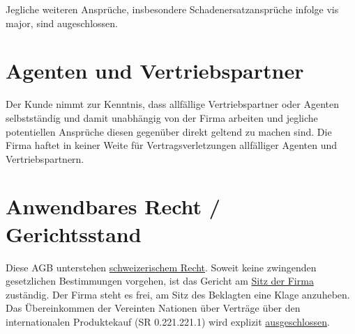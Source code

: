 \documentclass[twocolumn, 10pt]{article}
\begin{document}
Jegliche weiteren Ansprüche, insbesondere Schadenersatzansprüche infolge vis major, sind augeschlossen.

\section{Agenten und Vertriebspartner}
Der Kunde nimmt zur Kenntnis, dass allfällige Vertriebspartner oder Agenten selbstständig und damit unabhängig von der Firma arbeiten und jegliche potentiellen Ansprüche diesen gegenüber direkt geltend zu machen sind. Die Firma haftet in keiner Weite für Vertragsverletzungen allfälliger Agenten und Vertriebspartnern.

\section{Anwendbares Recht / Gerichtsstand}
Diese AGB unterstehen \underline{schweizerischem Recht}. Soweit keine zwingenden gesetzlichen Bestimmungen vorgehen, ist das Gericht am \underline{Sitz der Firma} zuständig. Der Firma steht es frei, am Sitz des Beklagten eine Klage anzuheben. Das Übereinkommen der Vereinten Nationen über Verträge über den internationalen Produktekauf (SR 0.221.221.1) wird explizit \underline{ausgeschlossen}.
\end{document}
